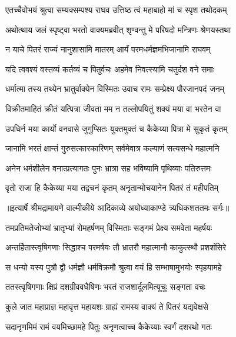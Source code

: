 \twolineshloka
{एतच्चैवोभयं श्रुत्वा सम्यक्सम्पश्य राघव}
{उत्तिष्ठ त्वं महाबाहो मां च स्पृश तथोदकम्} %

\twolineshloka
{अथोत्थाय जलं स्पृष्ट्वा भरतो वाक्यमब्रवीत्}
{शृण्वन्तु मे परिषदो मन्त्रिणः श्रेणयस्तथा} %

\twolineshloka
{न याचे पितरं राज्यं नानुशासामि मातरम्}
{आर्यं परमधर्मज्ञमभिजानामि राघवम्} %

\twolineshloka
{यदि त्ववश्यं वस्तव्यं कर्तव्यं च पितुर्वचः}
{अहमेव निवत्स्यामि चतुर्दश वने समाः} %

\twolineshloka
{धर्मात्मा तस्य तथ्येन भ्रातुर्वाक्येन विस्मितः}
{उवाच रामः सम्प्रेक्ष्य पौरजानपदं जनम्} %

\twolineshloka
{विक्रीतमाहितं क्रीतं यत्पित्रा जीवता मम}
{न तल्लोपयितुं शक्यं मया वा भरतेन वा} %

\twolineshloka
{उपधिर्न मया कार्यो वनवासे जुगुप्सितः}
{युक्तमुक्तं च कैकेय्या पित्रा मे सुकृतं कृतम्} %

\twolineshloka
{जानामि भरतं क्षान्तं गुरुसत्कारकारिणम्}
{सर्वमेवात्र कल्याणं सत्यसन्धे महात्मनि} %

\twolineshloka
{अनेन धर्मशीलेन वनात्प्रत्यागतः पुनः}
{भ्रात्रा सह भविष्यामि पृथिव्याः पतिरुत्तमः} %

\twolineshloka
{वृतो राजा हि कैकेय्या मया तद्वचनं कृतम्}
{अनृतान्मोचयानेन पितरं तं महीपतिम्} %


{॥इत्यार्षे श्रीमद्रामायणे वाल्मीकीये आदिकाव्ये अयोध्याकाण्डे त्र्यधिकशततमः सर्गः॥}


\twolineshloka
{तमप्रतिमतेजोभ्यां भ्रातृभ्यां रोमहर्षणम्}
{विस्मिताः सङ्गमं प्रेक्ष्य समवेता महर्षयः} %

\twolineshloka
{अन्तर्हितास्त्वृषिगणाः सिद्धाश्च परमर्षयः}
{तौ भ्रातरौ महात्मानौ काकुत्स्थौ प्रशशंसिरे} %

\twolineshloka
{स धन्यो यस्य पुत्रौ द्वौ धर्मज्ञौ धर्मविक्रमौ}
{श्रुत्वा वयं हि सम्भाषामुभयोः स्पृहयामहे} %

\twolineshloka
{ततस्त्वृषिगणाः क्षिप्रं दशग्रीववधैषिणः}
{भरतं राजशार्दूलमित्यूचुः सङ्गता वचः} %

\twolineshloka
{कुले जात महाप्राज्ञ महावृत्त महायशः}
{ग्राह्यं रामस्य वाक्यं ते पितरं यद्यवेक्षसे} %

\twolineshloka
{सदानृणमिमं रामं वयमिच्छामहे पितुः}
{अनृणत्वाच्च कैकेय्याः स्वर्गं दशरथो गतः} %

